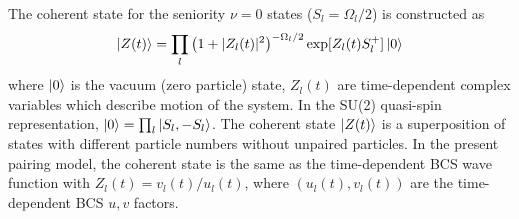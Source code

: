 \documentclass[%
superscriptaddress,
preprint,
showpacs,
nofootinbib,
amsmath,amssymb,
aps,
prc,
floatfix ]%
{revtex4-1}
\begin{document}
The coherent state for the seniority $\nu=0$ states
($S_l=\Omega_l/2$) is constructed as
\begin{equation}
	\ket{Z(t)} = \prod_{l} \left(1+|Z_l(t)|^2\right)^{-\Omega_l/2}
	\exp [Z_l(t) S_l^{+}] \ket{0}
 \label{coherent}
\end{equation}
where $\ket{0}$ is the vacuum (zero particle) state,
$Z_l(t)$ are time-dependent complex variables which describe
motion of the system. 
In the SU(2) quasi-spin representation,
$\ket{0}=\prod_l \ket{S_l,-S_l}$.
The coherent state $\ket{Z(t)}$ is a superposition of
states with different particle numbers
without unpaired particles.
In the present pairing model,
the coherent state is the same as the time-dependent BCS wave function
with $Z_l(t)=v_l(t)/u_l(t)$,
where $(u_l(t),v_l(t))$ are the time-dependent BCS $u,v$ factors.
\end{document}
